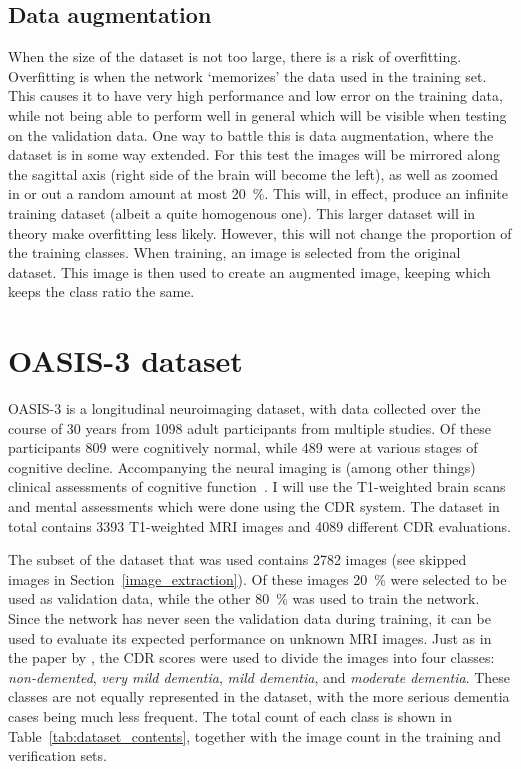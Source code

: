 \documentclass{kththesis}
\begin{document}
\subsection{Data augmentation}
When the size of the dataset is not too large, there is a risk of overfitting. Overfitting is when the network `memorizes' the data used in the training set. This causes it to have very high performance and low error on the training data, while not being able to perform well in general which will be visible when testing on the validation data. One way to battle this is data augmentation, where the dataset is in some way extended. For this test the images will be mirrored along the sagittal axis (right side of the brain will become the left), as well as zoomed in or out a random amount at most 20~\%. This will, in effect, produce an infinite training dataset (albeit a quite homogenous one). This larger dataset will in theory make overfitting less likely. However, this will not change the proportion of the training classes. When training, an image is selected from the original dataset. This image is then used to create an augmented image, keeping which keeps the class ratio the same.

\section{OASIS-3 dataset} \label{dataset}
OASIS-3 is a longitudinal neuroimaging dataset, with data collected over the course of 30 years from 1098 adult participants from multiple studies. Of these participants 809 were cognitively normal, while 489 were at various stages of cognitive decline. Accompanying the neural imaging is (among other things) clinical assessments of cognitive function~\cite{oasis3}. I will use the T1-weighted brain scans and mental assessments which were done using the CDR system. The dataset in total contains 3393 T1-weighted MRI images and 4089 different CDR evaluations.

The subset of the dataset that was used contains 2782 images (see skipped images in Section~\ref{image_extraction}). Of these images 20~\% were selected to be used as validation data, while the other 80~\% was used to train the network. Since the network has never seen the validation data during training, it can be used to evaluate its expected performance on unknown MRI images. Just as in the paper by \textcite{islam2018early}, the CDR scores were used to divide the images into four classes: \textit{non-demented}, \textit{very mild dementia}, \textit{mild dementia}, and \textit{moderate dementia}. These classes are not equally represented in the dataset, with the more serious dementia cases being much less frequent. The total count of each class is shown in Table~\ref{tab:dataset_contents}, together with the image count in the training and verification sets.
\end{document}
